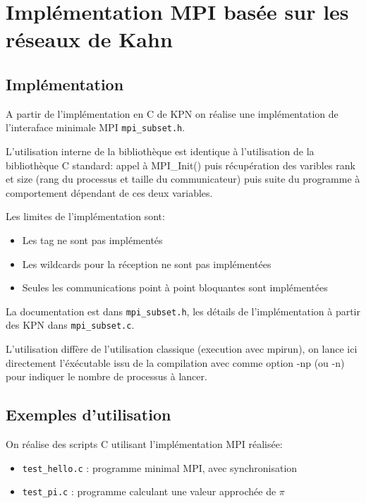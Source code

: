 \documentclass[a4paper]{article}
\begin{document}
\section{Implémentation MPI basée sur les réseaux de Kahn}

\subsection{Implémentation}

A partir de l'implémentation en C de KPN on réalise une implémentation de l'interaface minimale MPI \verb|mpi_subset.h|.

L'utilisation interne de la bibliothèque est identique à l'utilisation de la bibliothèque C standard: appel à MPI\_Init() puis récupération des varibles rank et size (rang du processus et taille du communicateur) puis suite du programme à comportement dépendant de ces deux variables.

Les limites de l'implémentation sont:
\begin{itemize}
    \item Les tag ne sont pas implémentés
    \item Les wildcards pour la réception ne sont pas implémentées
    \item Seules les communications point à point bloquantes sont implémentées
\end{itemize}

La documentation est dans \verb|mpi_subset.h|, les détails de l'implémentation à partir des KPN dans \verb|mpi_subset.c|.

L'utilisation diffère de l'utilisation classique (execution avec mpirun), on lance ici directement l'éxécutable issu de la compilation avec comme option -np (ou -n) pour indiquer le nombre de processus à lancer.

\subsection{Exemples d'utilisation}

On réalise des scripts C utilisant l'implémentation MPI réalisée:
\begin{itemize}
    \item \verb|test_hello.c| : programme minimal MPI, avec synchronisation
    \item \verb|test_pi.c| : programme calculant une valeur approchée de $\pi$
\end{itemize}
\end{document}
